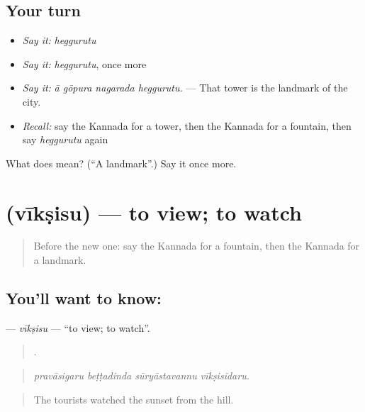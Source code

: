 \subsection*{Your turn}
\begin{itemize}
\raggedright
  \item \emph{Say it:} \emph{heggurutu}
  \item \emph{Say it:} \emph{heggurutu}, once more
  \item \emph{Say it:} \emph{ā gōpura nagarada heggurutu.} — That tower is the landmark of the city.
  \item \emph{Recall:} say the Kannada for a tower, then the Kannada for a fountain, then say \emph{heggurutu} again
\end{itemize}

\begin{tcolorbox}[breakable,colback=teal!4,colframe=teal!35!black,title={Before you move on}]
What does  mean? (\textquotedblleft{}A landmark\textquotedblright{}.) Say it once more.
\end{tcolorbox}
\section[\texorpdfstring{\kn{ವೀಕ್ಷಿಸು} (vīkṣisu)}{ವೀಕ್ಷಿಸು (vīkṣisu)}]{ (vīkṣisu) — to view; to watch}

\label{lesson:KA-C456-viksisu}



\begin{quote}
Before the new one: say the Kannada for a fountain, then the Kannada for a landmark.
\end{quote}

\subsection*{You'll want to know: }
\textbf{} — \emph{vīkṣisu} — \textquotedblleft{}to view; to watch\textquotedblright{}.

\begin{quote}
   .
\end{quote}

\begin{quote}
\emph{pravāsigaru beṭṭadinda sūryāstavannu vīkṣisidaru.}
\end{quote}

\begin{quote}
The tourists watched the sunset from the hill.
\end{quote}

